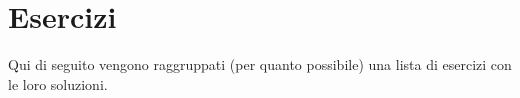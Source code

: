 \part{Esercizi}

Qui di seguito vengono raggruppati (per quanto possibile) una lista di esercizi
con le loro soluzioni.
